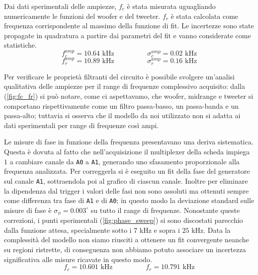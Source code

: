 \documentclass[12pt,italian]{article}
\begin{document}
Dai dati sperimentali delle ampiezze, $f_{c}$ è stata misurata uguagliando
numericamente le funzioni del woofer e del tweeter. $f_{r}$ è stata calcolata
come frequenza corrispondente al massimo della funzione di fit. Le incertezze
sono state propagate in quadratura a partire dai parametri del fit e vanno
considerate come statistiche.
\begin{equation*}
	f_{c}^{amp} = 10.64 \text{ kHz} \hspace{2cm} \sigma_c^{amp} = 0.02 \text{ kHz}
\end{equation*}
\begin{equation*}
	f_{r}^{amp} = 10.89 \text{ kHz} \hspace{2cm} \sigma_r^{amp} = 0.16 \text{ kHz}
\end{equation*}

Per verificare le proprietà filtranti del circuito è possibile svolgere
un'analisi qualitativa delle ampiezze per il range di frequenze complessivo
acquisito: dalla (\cref{fig:fc_fr}) si può notare, come ci aspettavamo, che
woofer, midrange e tweeter si comportano rispettivamente come un filtro
passa-basso, un passa-banda e un passa-alto; tuttavia si osserva che il modello
da noi utilizzato non si adatta ai dati sperimentali per range di frequenze
così ampi.

Le misure di fase in funzione della frequenza presentavano una deriva
sistematica. Questa è dovuta al fatto che nell'acquisizione il multiplexer
della scheda impiega $1$  a cambiare canale da \texttt{A0} a
\texttt{A1}, generando uno sfasamento proporzionale alla frequenza analizzata.
Per correggerla si è eseguito un fit della fase del generatore sul canale
\texttt{A1}, sottraendola poi al grafico di ciascun canale. Inoltre per
eliminare la dipendenza dal trigger i valori delle fasi non sono assoluti ma
ottenuti sempre come differenza tra fase di \texttt{A1} e di \texttt{A0}; in
questo modo la deviazione standard sulle misure di fase è $\sigma_\phi =
	0.003^\circ$ su tutto il range di frequenze. Nonostante queste correzioni, i
punti sperimentali (\cref{fig:phase_sweep}) si sono discostati parecchio dalla
funzione attesa, specialmente sotto i $7$ kHz e sopra i $25$ kHz. Data la
complessità del modello non siamo riusciti a ottenere un fit convergente
neanche su regioni ristrette, di conseguenza non abbiamo potuto associare un
incertezza significativa alle misure ricavate in questo modo.
\begin{equation*}
	f_{c} = 10.601 \text{ kHz} \hspace{2cm} f_{r} = 10.791 \text{ kHz}
\end{equation*}
\end{document}
